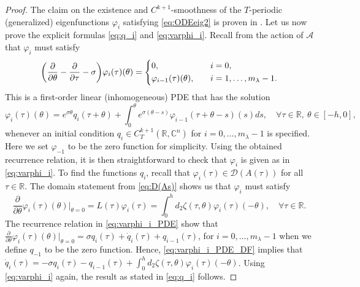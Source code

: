 \documentclass[english]{myarticle}
\begin{document}
\begin{sloppypar}
\begin{proof}
The claim on the existence and $C^{k+1}$-smoothness of the $T$-periodic (generalized) eigenfunctions $\varphi_i$ satisfying \eqref{eq:ODEeig2} is proven in \cite[Theorem 5]{Article2}. Let us now prove the explicit formulas \eqref{eq:q_i} and \eqref{eq:varphi_i}. Recall from the action of $\mathcal{A}$ that $\varphi_i$ must satisfy
\begin{equation*}
    \bigg(\frac{\partial}{\partial \theta} - \frac{\partial}{\partial \tau} - \sigma \bigg) \varphi_{i}(\tau)(\theta) = 
    \begin{dcases}
    0, \quad &i = 0, \\
    \varphi_{i-1}(\tau)(\theta), \quad &i=1,\dots,m_\lambda-1.
    \end{dcases}
\end{equation*}
This is a first-order linear (inhomogeneous) PDE that has the solution
\begin{equation} \label{eq:varphi_i_PDE}
    \varphi_i(\tau)(\theta) = e^{\sigma \theta}q_{i}(\tau+\theta) + \int_0^{\theta}e^{\sigma(\theta- s)} \varphi_{i-1}(\tau + \theta -s)(s) ds, \quad \forall \tau \in \mathbb{R}, \ \theta \in [-h,0],
\end{equation}
whenever an initial condition $q_i \in C_T^{k+1}(\mathbb{R},\mathbb{C}^n)$ for $i=0,\dots,m_\lambda-1$ is specified. Here we set $\varphi_{-1}$ to be the zero function for simplicity. Using the obtained recurrence relation, it is then straightforward to check that $\varphi_i$ is given as in \eqref{eq:varphi_i}. To find the functions $q_i$, recall that $\varphi_i(\tau) \in \mathcal{D}(A(\tau))$ for all $\tau \in \mathbb{R}$. The domain statement from \eqref{eq:D(As)} shows us that $\varphi_i$ must satisfy
\begin{equation} \label{eq:varphi_i_PDE_DF}
   \frac{\partial}{\partial \theta}\varphi_{i}(\tau)(\theta) \bigg |_{\theta = 0} = L(\tau)\varphi_{i}(\tau) = \int_0^h d_2\zeta(\tau,\theta)\varphi_{i}(\tau)(-\theta), \quad \forall \tau \in \mathbb{R}.
\end{equation}
The recurrence relation in \eqref{eq:varphi_i_PDE} show that $\frac{\partial}{\partial \theta}\varphi_{i}(\tau)(\theta) |_{\theta = 0} = \sigma q_i(\tau) + \dot{q}_i(\tau) + q_{i-1}(\tau)$, for $i=0,\dots,m_\lambda-1$ when we define $q_{-1}$ to be the zero function. Hence, \eqref{eq:varphi_i_PDE_DF} implies that $\dot{q}_{i}(\tau) = -\sigma q_i(\tau) - q_{i-1}(\tau) + \int_0^h d_2 \zeta(\tau,\theta) \varphi_{i}(\tau)(-\theta)$. Using \eqref{eq:varphi_i} again, the result as stated in \eqref{eq:q_i} follows.
\end{proof}


\end{sloppypar}
\end{document}

